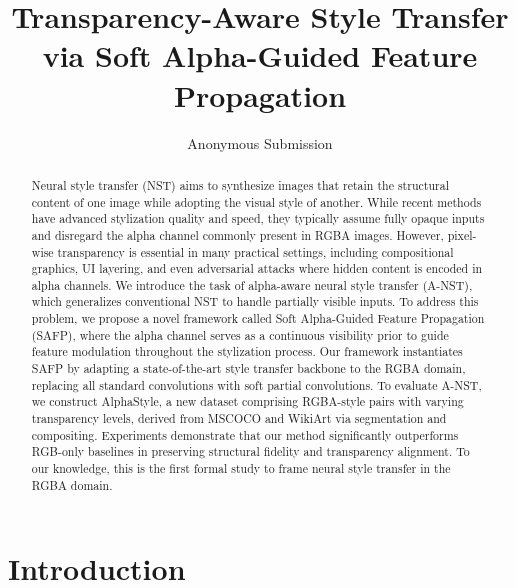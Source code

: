 \documentclass[letterpaper]{article} %
\title{Transparency-Aware Style Transfer via Soft Alpha-Guided Feature Propagation}
\author{
    Anonymous Submission
}
\begin{document}
\maketitle

\begin{abstract}
Neural style transfer (NST) aims to synthesize images that retain the structural content of one image while adopting the visual style of another. While recent methods have advanced stylization quality and speed, they typically assume fully opaque inputs and disregard the alpha channel commonly present in RGBA images. However, pixel-wise transparency is essential in many practical settings, including compositional graphics, UI layering, and even adversarial attacks where hidden content is encoded in alpha channels.
We introduce the task of alpha-aware neural style transfer (A-NST), which generalizes conventional NST to handle partially visible inputs. To address this problem, we propose a novel framework called Soft Alpha-Guided Feature Propagation (SAFP), where the alpha channel serves as a continuous visibility prior to guide feature modulation throughout the stylization process. Our framework instantiates SAFP by adapting a state-of-the-art style transfer backbone to the RGBA domain, replacing all standard convolutions with soft partial convolutions.
To evaluate A-NST, we construct AlphaStyle, a new dataset comprising RGBA-style pairs with varying transparency levels, derived from MSCOCO and WikiArt via segmentation and compositing. Experiments demonstrate that our method significantly outperforms RGB-only baselines in preserving structural fidelity and transparency alignment. To our knowledge, this is the first formal study to frame neural style transfer in the RGBA domain.
\end{abstract}


\section{Introduction}
\end{document}
